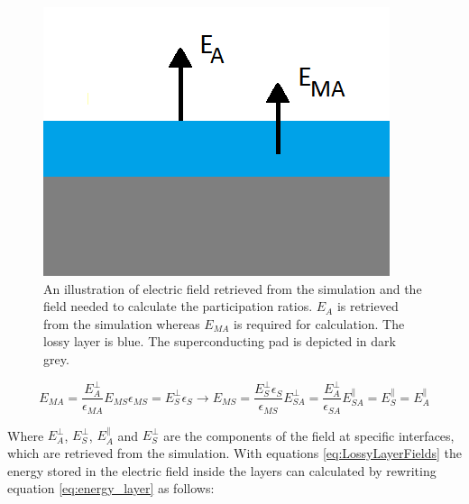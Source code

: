 \begin{figure}
	\centering
	\includegraphics[scale=.5]{Figures/approx}
	\caption{An illustration of electric field retrieved from the simulation and the field needed to calculate the participation ratios. \(E_{A}\) is retrieved from the simulation whereas \(E_{MA}\) is required for calculation. The lossy layer is blue. The superconducting pad is depicted in dark grey.}
	\label{fig:approx}
\end{figure}

\begin{subequations}\label{eq:LossyLayerFields}
	\begin{equation} \label{eq:LossyLayerFieldsA}
	E_{MA} =\frac{ E_{A}^{\bot}}{\epsilon_{MA}}
	\end{equation}	
	\begin{equation} \label{eq:LossyLayerFieldsB}
	E_{MS}\epsilon_{MS}=E_{S}^{\bot}\epsilon_{S} \rightarrow E_{MS}= \frac{E_{S}^{\bot}\epsilon_{S}}{\epsilon_{MS}}
	\end{equation}
	\begin{equation}\label{eq:LossyLayerFieldsC}
	E_{SA}^{\bot}=\frac{E_{A}^{\bot}}{\epsilon_{SA}}
	\end{equation}
	\begin{equation}\label{eq:LossyLayerFieldsD}
	E_{SA}^{\parallel}=E_{S}^{\parallel}=E_{A}^{\parallel}
	\end{equation}
\end{subequations}

Where \(E_{A}^{\bot}\), \(E_{S}^{\bot}\), \(E_{A}^{\parallel}\) and \(E_{S}^{\bot}\) are the components of the field at specific interfaces, which are retrieved from the simulation. With equations \eqref{eq:LossyLayerFields} the energy stored in the electric field inside the layers can calculated by rewriting equation \eqref{eq:energy_layer} as follows:

